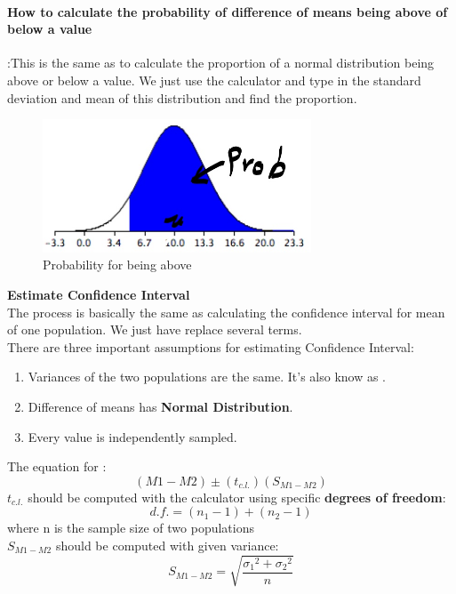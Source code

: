 \paragraph{\textbf{How to calculate the probability of difference of means being above of below a value}}
:This is the same as to calculate the proportion of a normal distribution being above or below a value. We just use the calculator and type in the standard deviation and mean of this distribution and find the proportion.
\begin{figure}[H]
        \centering
            \includegraphics[width=80mm]{prob1.jpg}
            \caption{Probability for being above}
            \label{Probability for being above}
\end{figure}

\textbf{Estimate Confidence Interval}
\\The process is basically the same as calculating the confidence interval for mean of one population. We just have replace several terms.
\\There are three important assumptions for estimating Confidence Interval:
\begin{enumerate}
    \item Variances of the two populations are the same. It's also know as .
    \item Difference of means has \textbf{Normal Distribution}.
    \item Every value is independently sampled.
\end{enumerate}
The equation for :
\begin{equation}
    (M1-M2)\pm (t_{c.l.})(S_{M1-M2})
\end{equation}
\(t_{c.l.}\) should be computed with the calculator using specific \textbf{degrees of freedom}:
\begin{equation}
    d.f.=(n_1-1)+(n_2-1)
\end{equation}
where n is the sample size of two populations
\\ \(S_{M1-M2}\) should be computed with given variance:
\begin{equation}
    S_{M1-M2}=\sqrt{\frac{{\sigma_1}^2+{\sigma_2}^2}{n}}
\end{equation}

